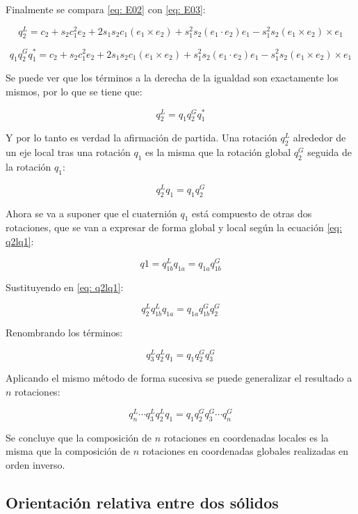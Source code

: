 \documentclass[12pt, a4paper]{report}
\begin{document}
Finalmente se compara \eqref{eq: E02} con \eqref{eq: E03}:

$$ q_2^L = c_2 + s_2c_1^2e_2 + 2s_1s_2c_1(e_1 \times e_2) + s_1^2s_2(e_1 \cdot e_2)e_1 - s_1^2s_2(e_1 \times e_2) \times e_1 $$

$$ q_1q_2^Gq_1^* = c_2 + s_2c_1^2e_2 + 2s_1s_2c_1(e_1 \times e_2) + s_1^2s_2(e_1 \cdot e_2)e_1 - s_1^2s_2(e_1 \times e_2) \times e_1 $$

Se puede ver que los términos a la derecha de la igualdad son exactamente los mismos, por lo que se tiene que:

\begin{equation} \label{eq: q2I}
q_2^L = q_1q_2^Gq_1^*
\end{equation}

Y por lo tanto es verdad la afirmación de partida. Una rotación $q_2^L$ alrededor de un eje local tras una rotación $q_1$ es la misma que la rotación global $q_2^G$ seguida de la rotación $q_1$:

\begin{equation} \label{eq: q2lq1}
q_2^Lq_1 = q_1q_2^G
\end{equation}

Ahora se va a suponer que el cuaternión $q_1$ está compuesto de otras dos rotaciones, que se van a expresar de forma global y local según la ecuación \eqref{eq: q2lq1}:

$$ q1 = q_{1b}^Lq_{1a} = q_{1a}q_{1b}^G $$

Sustituyendo en \eqref{eq: q2lq1}:

$$ q_2^Lq_{1b}^Lq_{1a} = q_{1a}q_{1b}^Gq_2^G $$

Renombrando los términos:

$$ q_3^Lq_{2}^Lq_{1} = q_{1}q_{2}^Gq_3^G $$

Aplicando el mismo método de forma sucesiva se puede generalizar el resultado a $n$ rotaciones:

\begin{equation}
q_n^L \dotsm q_3^Lq_{2}^Lq_{1} = q_{1}q_{2}^Gq_3^G \dotsm q_n^G
\end{equation}

Se concluye que la composición de $n$ rotaciones en coordenadas locales es la misma que la composición de $n$ rotaciones en coordenadas globales realizadas en orden inverso.

\subsection{Orientación relativa entre dos sólidos}
\end{document}
